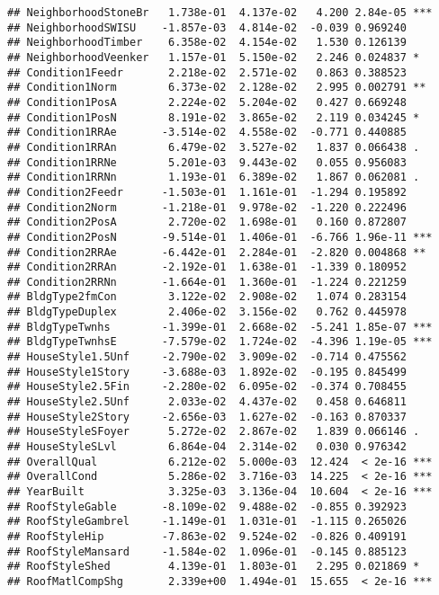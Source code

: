 \documentclass[
]{article}
\begin{document}
\begin{verbatim}
## NeighborhoodStoneBr   1.738e-01  4.137e-02   4.200 2.84e-05 ***
## NeighborhoodSWISU    -1.857e-03  4.814e-02  -0.039 0.969240    
## NeighborhoodTimber    6.358e-02  4.154e-02   1.530 0.126139    
## NeighborhoodVeenker   1.157e-01  5.150e-02   2.246 0.024837 *  
## Condition1Feedr       2.218e-02  2.571e-02   0.863 0.388523    
## Condition1Norm        6.373e-02  2.128e-02   2.995 0.002791 ** 
## Condition1PosA        2.224e-02  5.204e-02   0.427 0.669248    
## Condition1PosN        8.191e-02  3.865e-02   2.119 0.034245 *  
## Condition1RRAe       -3.514e-02  4.558e-02  -0.771 0.440885    
## Condition1RRAn        6.479e-02  3.527e-02   1.837 0.066438 .  
## Condition1RRNe        5.201e-03  9.443e-02   0.055 0.956083    
## Condition1RRNn        1.193e-01  6.389e-02   1.867 0.062081 .  
## Condition2Feedr      -1.503e-01  1.161e-01  -1.294 0.195892    
## Condition2Norm       -1.218e-01  9.978e-02  -1.220 0.222496    
## Condition2PosA        2.720e-02  1.698e-01   0.160 0.872807    
## Condition2PosN       -9.514e-01  1.406e-01  -6.766 1.96e-11 ***
## Condition2RRAe       -6.442e-01  2.284e-01  -2.820 0.004868 ** 
## Condition2RRAn       -2.192e-01  1.638e-01  -1.339 0.180952    
## Condition2RRNn       -1.664e-01  1.360e-01  -1.224 0.221259    
## BldgType2fmCon        3.122e-02  2.908e-02   1.074 0.283154    
## BldgTypeDuplex        2.406e-02  3.156e-02   0.762 0.445978    
## BldgTypeTwnhs        -1.399e-01  2.668e-02  -5.241 1.85e-07 ***
## BldgTypeTwnhsE       -7.579e-02  1.724e-02  -4.396 1.19e-05 ***
## HouseStyle1.5Unf     -2.790e-02  3.909e-02  -0.714 0.475562    
## HouseStyle1Story     -3.688e-03  1.892e-02  -0.195 0.845499    
## HouseStyle2.5Fin     -2.280e-02  6.095e-02  -0.374 0.708455    
## HouseStyle2.5Unf      2.033e-02  4.437e-02   0.458 0.646811    
## HouseStyle2Story     -2.656e-03  1.627e-02  -0.163 0.870337    
## HouseStyleSFoyer      5.272e-02  2.867e-02   1.839 0.066146 .  
## HouseStyleSLvl        6.864e-04  2.314e-02   0.030 0.976342    
## OverallQual           6.212e-02  5.000e-03  12.424  < 2e-16 ***
## OverallCond           5.286e-02  3.716e-03  14.225  < 2e-16 ***
## YearBuilt             3.325e-03  3.136e-04  10.604  < 2e-16 ***
## RoofStyleGable       -8.109e-02  9.488e-02  -0.855 0.392923    
## RoofStyleGambrel     -1.149e-01  1.031e-01  -1.115 0.265026    
## RoofStyleHip         -7.863e-02  9.524e-02  -0.826 0.409191    
## RoofStyleMansard     -1.584e-02  1.096e-01  -0.145 0.885123    
## RoofStyleShed         4.139e-01  1.803e-01   2.295 0.021869 *  
## RoofMatlCompShg       2.339e+00  1.494e-01  15.655  < 2e-16 ***

\end{verbatim}
\end{document}
